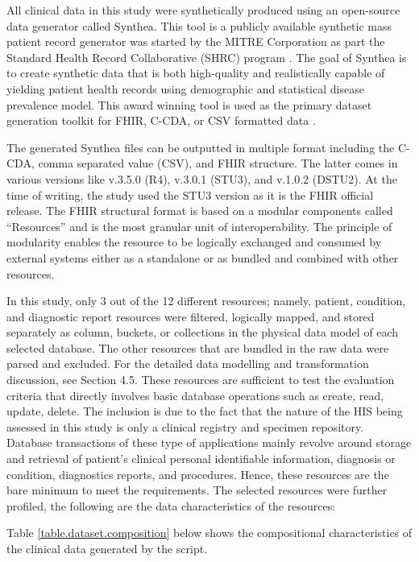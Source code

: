 \documentclass[5p]{elsarticle}
\begin{document}
All clinical data in this study were synthetically produced using an open-source data generator called
Synthea. This tool is a publicly available synthetic mass patient record generator was started by the MITRE Corporation as
part the Standard Health Record Collaborative (SHRC) program \cite{J.Walonoski2018230}. 
The goal of Synthea is to create synthetic data that is both high-quality and realistically capable of yielding patient health 
records using demographic and statistical disease prevalence model. This award winning \cite{HealthDataManagement2017} tool
is used as the primary dataset generation toolkit for FHIR, C-CDA, or CSV formatted data \cite{J.C.M2016899}.

The generated Synthea files can be outputted in multiple format including the C-CDA, comma separated value (CSV), and FHIR structure. 
The latter comes in various versions like v.3.5.0 (R4), v.3.0.1 (STU3), and v.1.0.2 (DSTU2). At the time of writing, 
the study used the STU3 version as it is the FHIR official release. The FHIR structural format is based on a modular components called “Resources” 
and is the most granular unit of interoperability. The principle of modularity enables the resource to be logically 
exchanged and consumed by external systems either as a standalone or as bundled and combined with other resources. 

In this study, only 3 out of the 12 different resources; namely, patient, condition, and diagnostic report resources were filtered, logically mapped,
and stored separately as column, buckets, or collections in the physical data model of each selected database. 
The other resources that are bundled in the raw data were parsed and excluded. For the detailed data modelling and transformation discussion, 
see Section 4.5.
These resources are sufficient to test the evaluation criteria that directly involves basic database operations such as create, read, update, delete. 
The inclusion is due to the fact that the nature of the HIS being assessed in this study is only a clinical registry and specimen repository.
Database transactions of these type of applications mainly revolve around storage and retrieval of patient’s clinical personal identifiable information,
diagnosis or condition, diagnostics reports, and procedures. Hence, these resources are the bare minimum to meet the requirements.
The selected resources were further profiled, the following are the data characteristics of the resources:

Table \ref{table.dataset.composition} below shows the compositional characteristics of the clinical data generated by the script. 
\end{document}
